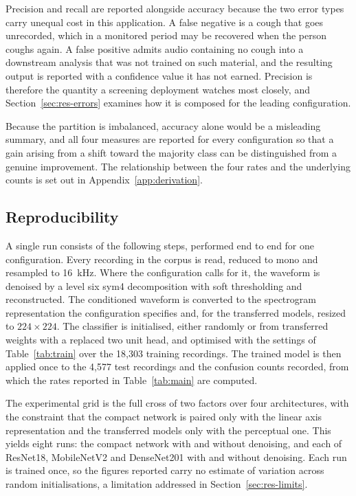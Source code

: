 Precision and recall are reported alongside accuracy because the two error
types carry unequal cost in this application. A false negative is a cough that
goes unrecorded, which in a monitored period may be recovered when the person
coughs again. A false positive admits audio containing no cough into a
downstream analysis that was not trained on such material, and the resulting
output is reported with a confidence value it has not earned. Precision is
therefore the quantity a screening deployment watches most closely, and
Section~\ref{sec:res-errors} examines how it is composed for the leading
configuration.

Because the partition is imbalanced, accuracy alone would be a misleading
summary, and all four measures are reported for every configuration so that a
gain arising from a shift toward the majority class can be distinguished from
a genuine improvement. The relationship between the four rates and the
underlying counts is set out in Appendix~\ref{app:derivation}.

\subsection{Reproducibility}\label{sec:s-repro}

A single run consists of the following steps, performed end to end for one
configuration. Every recording in the corpus is read, reduced to mono and
resampled to 16~kHz. Where the configuration calls for it, the waveform is
denoised by a level six sym4 decomposition with soft thresholding and
reconstructed. The conditioned waveform is converted to the spectrogram
representation the configuration specifies and, for the transferred models,
resized to $224 \times 224$. The classifier is initialised, either randomly or
from transferred weights with a replaced two unit head, and optimised with the
settings of Table~\ref{tab:train} over the 18,303 training recordings. The
trained model is then applied once to the 4,577 test recordings and the
confusion counts recorded, from which the rates reported in
Table~\ref{tab:main} are computed.

The experimental grid is the full cross of two factors over four
architectures, with the constraint that the compact network is paired only
with the linear axis representation and the transferred models only with the
perceptual one. This yields eight runs: the compact network with and without
denoising, and each of ResNet18, MobileNetV2 and DenseNet201 with and without
denoising. Each run is trained once, so the figures reported carry no estimate
of variation across random initialisations, a limitation addressed in
Section~\ref{sec:res-limits}.

